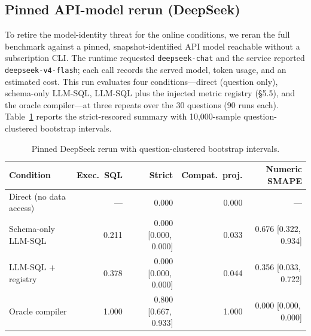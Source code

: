\documentclass[11pt]{article}
\newcommand{\ci}[2]{[#1,\,#2]}
\begin{document}
\subsection{Pinned API-model rerun (DeepSeek)}
To retire the model-identity threat for the online conditions, we reran the full
benchmark against a pinned, snapshot-identified API model reachable without a
subscription CLI. The runtime requested \texttt{deepseek-chat} and the service
reported \texttt{deepseek-v4-flash}; each call records the served model, token
usage, and an estimated cost. This run evaluates four conditions---direct
(question only), schema-only LLM-SQL, LLM-SQL plus the injected metric registry
(\S5.5), and the oracle compiler---at three repeats over the 30 questions (90
runs each). Table~\ref{tab:deepseek} reports the strict-rescored summary with
10,000-sample question-clustered bootstrap intervals.

\begin{table}[h]
\centering\small
\begin{tabular}{lrrrr}
\toprule
Condition & Exec.\ SQL & Strict & Compat.\ proj. & Numeric SMAPE \\
\midrule
Direct (no data access) & --- & 0.000 & 0.000 & --- \\
Schema-only LLM-SQL & 0.211 & 0.000 \ci{0.000}{0.000} & 0.033 & 0.676 \ci{0.322}{0.934} \\
LLM-SQL + registry & 0.378 & 0.000 \ci{0.000}{0.000} & 0.044 & 0.356 \ci{0.033}{0.722} \\
Oracle compiler & 1.000 & 0.800 \ci{0.667}{0.933} & 1.000 & 0.000 \ci{0.000}{0.000} \\
\bottomrule
\end{tabular}
\caption{Pinned DeepSeek rerun with question-clustered bootstrap intervals.}
\label{tab:deepseek}
\end{table}
\end{document}
